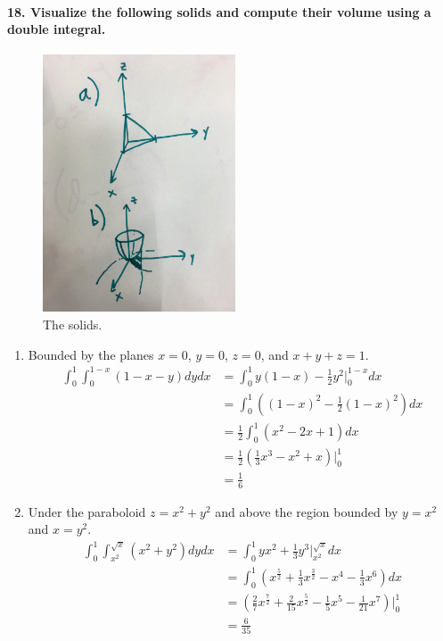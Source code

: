 \documentclass{article}
\begin{document}
\paragraph{18. Visualize the following solids and compute their volume using a double integral.}

\begin{figure}[H]
    \centering
    \includegraphics[height=3in]{regions2.jpg}
    \caption{The solids.}
\end{figure}

\begin{enumerate}
    \item Bounded by the planes $x = 0$, $y=0$, $z=0$, and $x+y+z=1$.
    \begin{align*}
        \int_0^1 \int_0^{1-x} (1-x-y) dy dx &= \int_0^1 y(1-x) - \frac{1}{2}y^2 \Bigr|_{0}^{1-x} dx \\
        &= \int_0^1 \left((1-x)^2 - \frac{1}{2}(1-x)^2\right) dx \\
        &= \frac{1}{2} \int_0^1 (x^2 - 2x + 1) dx  \\
        &= \frac{1}{2} \left(\frac{1}{3}x^3 - x^2 + x\right)\Bigr|_{0}^{1} \\
        &= \frac{1}{6}
    \end{align*}
    \item Under the paraboloid $z = x^2 + y^2$ and above the region bounded by $y=x^2$ and $x=y^2$.
    \begin{align*}
        \int_0^1 \int_{x^2}^{\sqrt{x}} \left(x^2 + y^2\right) dy dx &= \int_0^1 yx^2 + \frac{1}{3}y^3 \Bigr|_{x^2}^{\sqrt{x}} dx \\
        &= \int_0^1 \left(x^\frac{5}{2} + \frac{1}{3}x^\frac{3}{2} - x^4 - \frac{1}{3}x^6\right)dx \\
        &= \left(\frac{2}{7}x^\frac{7}{2} + \frac{2}{15}x^\frac{5}{2} - \frac{1}{5}x^5 - \frac{1}{21}x^7\right) \Bigr|_{0}^{1} \\
        &= \frac{6}{35}
    \end{align*}
\end{enumerate}
\end{document}
